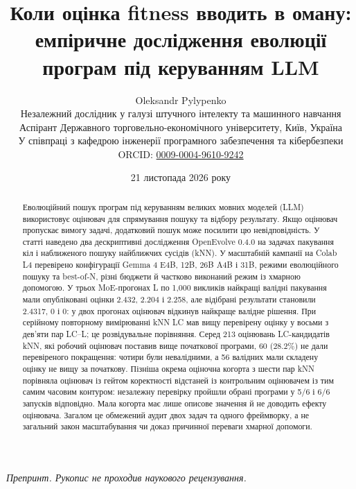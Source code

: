 \documentclass[11pt]{article}
\begin{document}
\title{Коли оцінка fitness вводить в оману: емпіричне дослідження еволюції програм під керуванням LLM}
\author{Oleksandr Pylypenko\\[2pt]\small Незалежний дослідник у галузі штучного інтелекту та машинного навчання\\
\small Аспірант Державного торговельно-економічного університету, Київ, Україна\\
\small У співпраці з кафедрою інженерії програмного забезпечення та кібербезпеки\\[2pt]
\small ORCID: \href{https://orcid.org/0009-0004-9610-9242}{0009-0004-9610-9242}}
\date{21 листопада 2026 року}
\maketitle

\begin{center}\small\textit{Препринт. Рукопис не проходив наукового рецензування.}\end{center}

\begin{abstract}
Еволюційний пошук програм під керуванням великих мовних моделей (LLM) використовує оцінювач для спрямування пошуку та відбору результату. Якщо оцінювач пропускає вимогу задачі, додатковий пошук може посилити цю невідповідність. У статті наведено два дескриптивні дослідження OpenEvolve 0.4.0 на задачах пакування кіл і наближеного пошуку найближчих сусідів (kNN). У масштабній кампанії на Colab L4 перевірено конфігурації Gemma 4 E4B, 12B, 26B A4B і 31B, режими еволюційного пошуку та best-of-N, різні бюджети й частково виконаний режим із хмарною допомогою. У трьох MoE-прогонах L по 1{,}000 викликів найкращі валідні пакування мали опубліковані оцінки 2.432, 2.204 і 2.258, але відібрані результати становили 2.4317, 0 і 0: у двох прогонах оцінювач відкинув найкраще валідне рішення. При серійному повторному вимірюванні kNN LC мав вищу перевірену оцінку у восьми з дев'яти пар LC--L; це розвідувальне порівняння. Серед 213 оцінювань LC-кандидатів kNN, які робочий оцінювач поставив вище початкової програми, 60 (28.2\%) не дали перевіреного покращення: чотири були невалідними, а 56 валідних мали складену оцінку не вищу за початкову. Пізніша окрема оціночна когорта з шести пар kNN порівняла оцінювач із гейтом коректності відстаней із контрольним оцінювачем із тим самим часовим контуром: незалежну перевірку пройшли обрані програми у 5/6 і 6/6 запусків відповідно. Мала когорта має лише описове значення й не доводить ефекту оцінювача. Загалом це обмежений аудит двох задач та одного фреймворку, а не загальний закон масштабування чи доказ причинної переваги хмарної допомоги.
\end{abstract}
\end{document}
